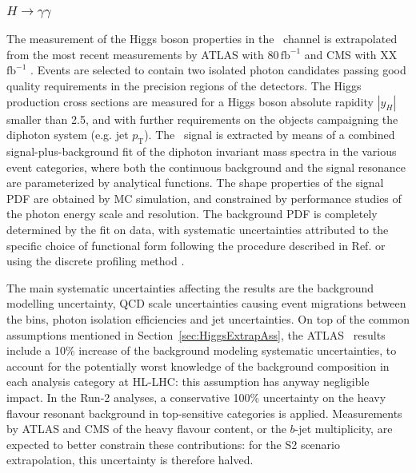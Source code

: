 \HWW\subsubsection{$H \to \gamma\gamma$}
\label{sec:Hgammagamma}

The measurement of the Higgs boson properties in the \Hyy\ channel is extrapolated from the most recent measurements by ATLAS with 80\,$\mathrm{fb}^{-1}$ \cite{ATLAS:2018uso} and CMS with XX\,$\mathrm{fb}^{-1}$ \cite{}.
Events are selected to contain two isolated photon candidates passing good quality requirements in the precision regions of the detectors.
The Higgs production cross sections are measured for a Higgs boson absolute rapidity $|y_H|$ smaller than 2.5, and with further requirements on the objects campaigning the diphoton system (e.g. jet $p_\mathrm{T}$).
The \Hyy\ signal is extracted by means of a combined signal-plus-background fit of the diphoton invariant mass spectra in the various event categories, where both the continuous background and the signal resonance are parameterized by analytical functions. The shape properties of the signal PDF are obtained by MC simulation, and constrained by performance studies of the photon energy scale and resolution. The background PDF is completely determined by the fit on data, with systematic uncertainties attributed to the specific choice of functional form following the procedure described in Ref. \cite{Aad:2012tfa} or using the discrete profiling method \cite{Dauncey:2014xga}.

The main systematic uncertainties affecting the results are the background modelling uncertainty, QCD scale uncertainties causing event migrations between the bins, photon isolation efficiencies and jet uncertainties.
%
On top of the common assumptions mentioned in Section~\ref{sec:HiggsExtrapAss}, the ATLAS \Hyy\ results include a 10\% increase of the background modeling systematic uncertainties, to account for the potentially worst knowledge of the background composition in each analysis category at HL-LHC: this assumption has anyway negligible impact.
%
In the Run-2 analyses, a conservative 100\% uncertainty on the heavy flavour resonant background in top-sensitive categories is applied. Measurements by ATLAS and CMS of the heavy flavour content, or the $b$-jet multiplicity, are expected to better constrain these contributions: for the S2 scenario extrapolation, this uncertainty is therefore halved.

